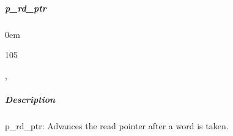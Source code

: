 \documentclass[letterpaper,10pt,english]{sphinxmanual}
\begin{document}
\sphinxstepscope


\subparagraph{p\_rd\_ptr}
\label{\detokenize{modules/async_fifo/processes/p_rd_ptr:p-rd-ptr}}\label{\detokenize{modules/async_fifo/processes/p_rd_ptr::doc}}
\begin{DUlineblock}{0em}
\item[]  
\item[]  105
\item[]  
\item[]  , 
\end{DUlineblock}


\subparagraph{Description}
\label{\detokenize{modules/async_fifo/processes/p_rd_ptr:description}}
\sphinxAtStartPar
p\_rd\_ptr: Advances the read pointer after a word is taken.
\end{document}
